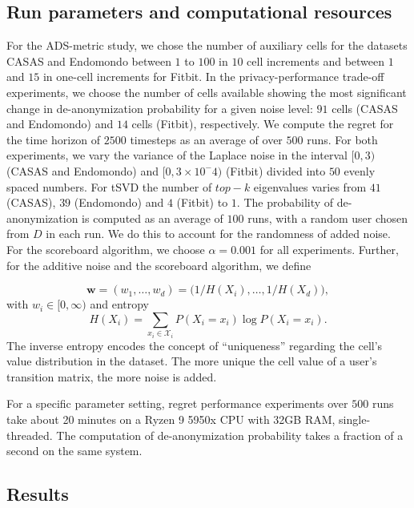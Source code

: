 \documentclass{article}
\begin{document}
\subsection{Run parameters and computational resources} For the ADS-metric study, we chose the number of auxiliary cells for the datasets CASAS and Endomondo between $1$ to $100$ in $10$ cell increments and between $1$ and $15$ in one-cell increments for Fitbit. In the privacy-performance trade-off experiments, we choose the number of cells available showing the most significant change in de-anonymization probability for a given noise level: $91$ cells (CASAS and Endomondo) and $14$ cells (Fitbit), respectively. We compute the regret for the time horizon of $2500$ timesteps as an average of over $500$ runs. For both experiments, we vary the variance of the Laplace noise in the interval $[0, 3)$ (CASAS and Endomondo) and $[0, 3\times10^-4)$ (Fitbit) divided into $50$ evenly spaced numbers. For tSVD the number of $top-k$ eigenvalues varies from $41$ (CASAS), $39$ (Endomondo) and $4$ (Fitbit) to $1$. The probability of de-anonymization is computed as an average of $100$ runs, with a random user chosen from $D$ in each run. We do this to account for the randomness of added noise. For the scoreboard algorithm, we choose $\alpha = 0.001$ for all experiments. Further, for the additive noise and the scoreboard algorithm, we define 

\[\mathbf{w} = (w_1, \dots, w_d) = \big(1/{H(X_i)}, \dots, 1/{H(X_d)}\big),\] with $w_i \in [0, \infty)$ and entropy \[H(X_i) = \sum_{x_i \in \mathcal{X}_i}P(X_i = x_i) \log P(X_i = x_i).\] The inverse entropy encodes the concept of ``uniqueness'' regarding the cell's value distribution in the dataset. The more unique the cell value of a user's transition matrix, the more noise is added. 

For a specific parameter setting, regret performance experiments over $500$ runs take about 20 minutes on a Ryzen 9 5950x CPU with 32GB RAM, single-threaded. The computation of de-anonymization probability takes a fraction of a second on the same system.    


\subsection{Results}
\end{document}
